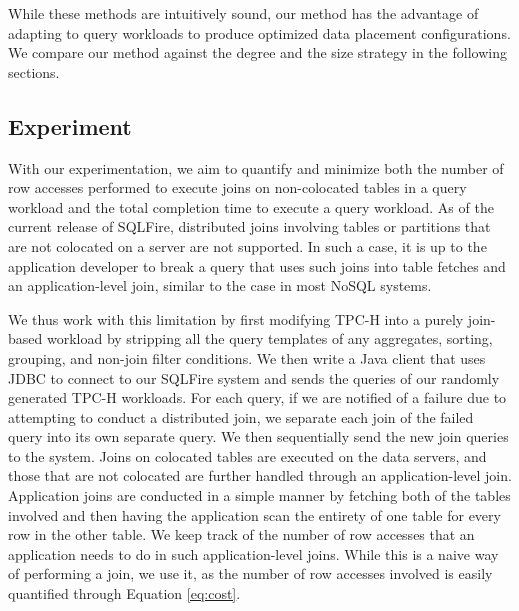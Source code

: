\vspace*{-7pt} \noindent While these methods are intuitively sound, our method has the advantage of adapting to query workloads to produce optimized data placement configurations.  We compare our method against the degree and the size strategy in the following sections.
\label{sec:alternative}

\subsection{Experiment}
\label{sec:experiment}
With our experimentation, we aim to quantify and minimize both the number of row accesses performed to execute joins on non-colocated tables in a query workload and the total completion time to execute a query workload.  As of the current release of SQLFire, distributed joins involving tables or partitions that are not colocated on a server are not supported.  In such a case, it is up to the application developer to break a query that uses such joins into table fetches and an application-level join, similar to the case in most NoSQL systems.  

We thus work with this limitation by first modifying TPC-H into a purely join-based workload by stripping all the query templates of any aggregates, sorting, grouping, and non-join filter conditions.  We then write a Java client that uses JDBC to connect to our SQLFire system and sends the queries of our randomly generated TPC-H workloads.  For each query, if we are notified of a failure due to attempting to conduct a distributed join, we separate each join of the failed query into its own separate query.  We then sequentially send the new join queries to the system.  Joins on colocated tables are executed on the data servers, and those that are not colocated are further handled through an application-level join.  Application joins are conducted in a simple manner by fetching both of the tables involved and then having the application scan the entirety of one table for every row in the other table.  We keep track of the number of row accesses that an application needs to do in such application-level joins.  While this is a naive way of performing a join, we use it, as the number of row accesses involved is easily quantified through Equation \ref{eq:cost}.

